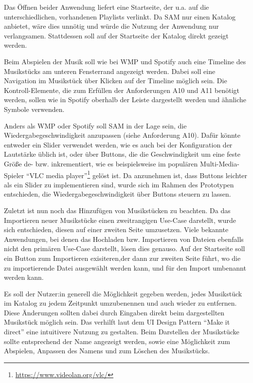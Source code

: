 Das Öffnen beider Anwendung liefert eine Startseite, der u.a. auf die unterschiedlichen, vorhandenen Playlists verlinkt.
Da \ac{SAM} nur einen Katalog anbietet, wäre dies unnötig und würde die Nutzung der Anwendung nur verlangsamen.
Stattdessen soll auf der Startseite der Katalog direkt gezeigt werden.

Beim Abspielen der Musik soll wie bei \ac{WMP} und Spotify auch eine Timeline des Musikstücks am unteren Fensterrand angezeigt werden.
Dabei soll eine Navigation im Musikstück über Klicken auf der Timeline möglich sein.
Die Kontroll-Elemente, die zum Erfüllen der Anforderungen A10 und A11 benötigt werden, sollen wie in Spotify oberhalb der Leiste dargestellt werden und ähnliche Symbole verwenden.

Anders als \ac{WMP} oder Spotify soll \ac{SAM} in der Lage sein, die Wiedergabegeschwindigkeit anzupassen (siehe Anforderung A10).
Dafür könnte entweder ein Slider verwendet werden, wie es auch bei der Konfiguration der Lautstärke üblich ist, oder über Buttons, die die Geschwindigkeit um eine feste Größe de- bzw. inkrementiert, wie es beispielsweise im populären Multi-Media-Spieler \enquote{VLC media player}\footnote{\url{https://www.videolan.org/vlc/}} gelöst ist.
Da anzunehmen ist, dass Buttons leichter als ein Slider zu implementieren sind, wurde sich im Rahmen des Prototypen entschieden, die Wiedergabegeschwindigkeit über Buttons steuern zu lassen.

Zuletzt ist nun noch das Hinzufügen von Musikstücken zu beachten.
Da das Importieren neuer Musikstücke einen zweitrangigen Use-Case darstellt, wurde sich entschieden, diesen auf einer zweiten Seite umzusetzen.
Viele bekannte Anwendungen, bei denen das Hochladen bzw. Importieren von Dateien ebenfalls nicht den primären Use-Case darstellt, lösen dies genauso. %
Auf der Startseite soll ein Button zum Importieren exisiteren,der dann zur zweiten Seite führt, wo die zu importierende Datei ausgewählt werden kann, und für den Import umbenannt werden kann.

Es soll der Nutzer:in generell die Möglichkeit gegeben werden, jedes Musikstück im Katalog zu jedem Zeitpunkt umzubenennen und auch wieder zu entfernen.
Diese Änderungen sollten dabei durch Eingaben direkt beim dargestellten Musikstück möglich sein.
Das verhilft laut dem \ac{UI} Design Pattern \enquote{Make it direct} eine intuitivere Nutzung zu gestalten.
Beim Darstellen der Musikstücke sollte entsprechend der Name angezeigt werden, sowie eine Möglichkeit zum Abspielen, Anpassen des Namens und zum Löschen des Musikstücks.

